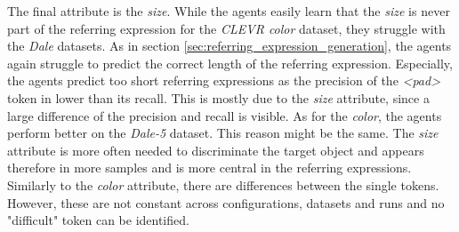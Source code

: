 The final attribute is the \emph{size}.
While the agents easily learn that the \emph{size} is never part of the referring expression for the \emph{CLEVR color} dataset, they struggle with the \emph{Dale} datasets.
As in section \ref{sec:referring_expression_generation}, the agents again struggle to predict the correct length of the referring expression.
Especially, the agents predict too short referring expressions as the precision of the \emph{<pad>} token in lower than its recall.
This is mostly due to the \emph{size} attribute, since a large difference of the precision and recall is visible.
As for the \emph{color}, the agents perform better on the \emph{Dale-5} dataset.
This reason might be the same.
The \emph{size} attribute is more often needed to discriminate the target object and appears therefore in more samples and is more central in the referring expressions.
Similarly to the \emph{color} attribute, there are differences between the single tokens.
However, these are not constant across configurations, datasets and runs and no "difficult" token can be identified.

